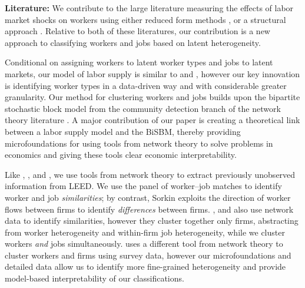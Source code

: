 \documentclass[12pt]{article}
\theoremstyle{definition}
\theoremstyle{plain}
\begin{document}


\textbf{Literature:} We contribute to the large literature measuring the effects of labor market shocks on workers using either reduced form methods \citep{AutorDornHanson2013,Card1990,AutorDornHansonSong2014,Yagan2017,BoundHolzer2000,BlanchardKatz1992,Bartik1991}, or a structural approach \citep{BursteinMoralesVogel2019,CaliendoDvorkinParro2019,GalleRodriguezclareYi2017,KimVogel2021}. Relative to both of these literatures, our contribution is a new approach to classifying workers and jobs based on latent heterogeneity.

Conditional on assigning workers to latent worker types and jobs to latent markets, our model of labor supply is similar to \citet{Grigsby2019} and \citet{BonhommeLamadonManresa2019_distributional}, however our key innovation is identifying worker types in a data-driven way and with considerable greater granularity. Our method for clustering workers and jobs builds upon the bipartite stochastic block model from the community detection branch of the network theory literature \citep{LarremoreClausetJacobs2014,Peixoto2019}. A major contribution of our paper is creating a theoretical link between a labor supply model and the BiSBM, thereby providing microfoundations for using tools from network theory to solve problems in economics and giving these tools clear economic interpretability. 


Like \citet{Sorkin2018}, \citet{Nimczik2018}, and \citet{JaroschNimczikSorkin2019}, we use tools from network theory to extract previously unobserved information from LEED. We use the panel of worker--job matches to identify worker and job \emph{similarities}; by contrast, Sorkin exploits the direction of worker flows between firms to identify \emph{differences} between firms. \citet{Nimczik2018}, and \citet{JaroschNimczikSorkin2019} also use network data to identify similarities, however they cluster together only firms, abstracting from worker heterogeneity and within-firm job heterogeneity, while we cluster workers \emph{and} jobs simultaneously. \citet{Schmutte2014} uses a different tool from network theory to cluster workers and firms using survey data, however our microfoundations and detailed data allow us to identify more fine-grained heterogeneity and provide model-based interpretability of our classifications. 
\end{document}
